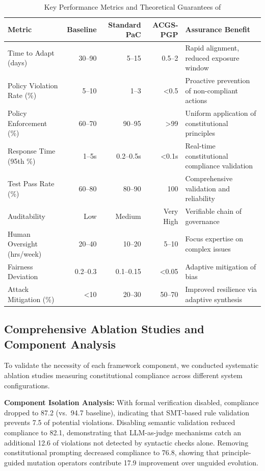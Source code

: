 \begin{table}[!htb]
\centering
\caption{Key Performance Metrics and Theoretical Guarantees of \acgs{}}\label{tab:key_results}
\small
\begin{tabularx}{\textwidth}{@{} l r r r X @{}}
\toprule
\textbf{Metric} & \textbf{Baseline} & \textbf{Standard PaC} & \textbf{ACGS-PGP} & \textbf{Assurance Benefit} \\
\midrule
Time to Adapt (days) & 30--90 & 5--15 & 0.5--2 & Rapid alignment, reduced exposure window \\
Policy Violation Rate (\%) & 5--10 & 1--3 & <0.5 & Proactive prevention of non-compliant actions \\
Policy Enforcement (\%) & 60--70 & 90--95 & >99 & Uniform application of constitutional principles \\
Response Time (95th \%) & 1--5s & 0.2--0.5s & <0.1s & Real-time constitutional compliance validation \\
Test Pass Rate (\%) & 60--80 & 80--90 & 100 & Comprehensive validation and reliability \\
Auditability & Low & Medium & Very High & Verifiable chain of governance \\
Human Oversight (hrs/week) & 20--40 & 10--20 & 5--10 & Focus expertise on complex issues \\
Fairness Deviation & 0.2--0.3 & 0.1--0.15 & <0.05 & Adaptive mitigation of bias \\
Attack Mitigation (\%) & <10 & 20--30 & 50--70 & Improved resilience via adaptive synthesis \\
\bottomrule
\end{tabularx}
\end{table}

\subsection{Comprehensive Ablation Studies and Component Analysis}

To validate the necessity of each framework component, we conducted systematic ablation studies measuring constitutional compliance across different system configurations.

\textbf{Component Isolation Analysis:} With formal verification disabled, compliance dropped to 87.2\percent{} (vs.\ 94.7\percent{} baseline), indicating that SMT-based rule validation prevents 7.5\percent{} of potential violations. Disabling semantic validation reduced compliance to 82.1\percent{}, demonstrating that LLM-as-judge mechanisms catch an additional 12.6\percent{} of violations not detected by syntactic checks alone. Removing constitutional prompting decreased compliance to 76.8\percent{}, showing that principle-guided mutation operators contribute 17.9\percent{} improvement over unguided evolution.

